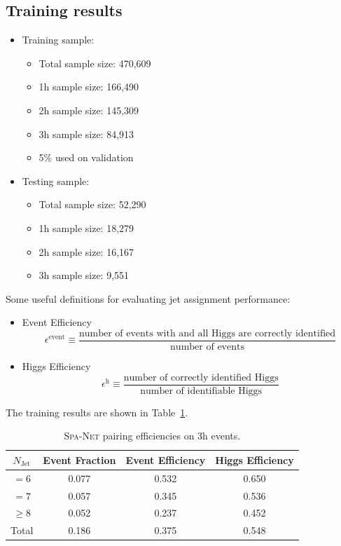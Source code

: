\documentclass[12pt]{article}
\begin{document}
	\subsection{Training results}%
	\label{sub:training_results}
		\begin{itemize}
			\item Training sample:
			\begin{itemize}
				\item Total sample size: 470,609
				\item 1h sample size: 166,490
				\item 2h sample size: 145,309
				\item 3h sample size: 84,913
				\item 5\% used on validation
			\end{itemize}
			\item Testing sample: 
			\begin{itemize}
				\item Total sample size: 52,290
				\item 1h sample size: 18,279
				\item 2h sample size: 16,167
				\item 3h sample size: 9,551
			\end{itemize}
		\end{itemize}

		Some useful definitions for evaluating jet assignment performance:
		\begin{itemize}		
		\item Event Efficiency
		\begin{equation}
			\epsilon^{\text{event}} \equiv \frac{\text{number of events with and all Higgs are correctly identified}}{\text{number of events}} 
		\end{equation}

		\item Higgs Efficiency
		\begin{equation}
			\epsilon^{\text{h}} \equiv \frac{\text{number of correctly identified Higgs}}{\text{number of identifiable Higgs}} 
		\end{equation}
	\end{itemize}
		The training results are shown in Table~\ref{tab:SPANet_triHiggs_0b}.
		\begin{table}[htpb]
			\centering
			\caption{\textsc{Spa-Net} pairing efficiencies on 3h events.}
			\label{tab:SPANet_triHiggs_0b}
			\begin{tabular}{c|c|cc}
				$N_\text{Jet}$ & Event Fraction & Event Efficiency & Higgs Efficiency \\
				\hline
				$=6$	  &   0.077             &    0.532              &    0.650             \\
				$=7$	  &   0.057             &    0.345              &    0.536             \\
				$\ge 8$	  &   0.052             &    0.237              &    0.452             \\
				Total	  &   0.186             &    0.375              &    0.548   
			\end{tabular}
		\end{table}
\end{document}
